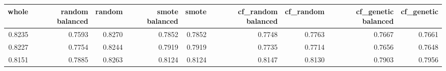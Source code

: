 \begin{tabular}{rrrrrrrrr}
\toprule

 whole &  random balanced &  random &  smote balanced &  smote &  cf\_random balanced &  cf\_random &  cf\_genetic balanced &  cf\_genetic \\
\midrule

0.8235 &           0.7593 &  0.8270 &          0.7852 & 0.7852 &              0.7748 &     0.7763 &               0.7667 &      0.7661 \\
0.8227 &           0.7754 &  0.8244 &          0.7919 & 0.7919 &              0.7735 &     0.7714 &               0.7656 &      0.7648 \\
0.8151 &           0.7885 &  0.8263 &          0.8124 & 0.8124 &              0.8147 &     0.8130 &               0.7903 &      0.7956 \\

\bottomrule
\end{tabular}

